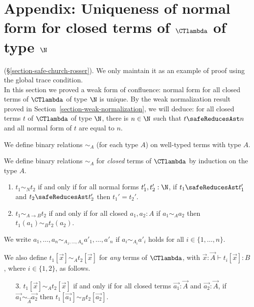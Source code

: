 
\section{Appendix: Uniqueness of normal form for closed terms of $\CTlambda$ of type $\N$}
\label{section-uniqueness-normal-form}
(\S \ref{section-safe-church-rosser}). 
We only maintain it as an example of proof using the global trace condition.
\\

In this section we proved a weak form of confluence: normal form for
all closed terms of $\CTlambda$ of type $\N$ is unique.
By the weak normalization result proved in Section~\ref{section-weak-normalization},
we will deduce: for all closed terms $t$ of $\CTlambda$ of type $\N$,
there is $n \in \N$ such that $t \safeReducesAst n$
and all normal form of $t$ are equal to $n$. 

We define binary relations $\sim_A$ (for each type $A$) on well-typed terms with type $A$.
\begin{definition}
  We define binary relations $\sim_A$ for \emph{closed} terms of $\CTlambda$
  by induction on the type $A$. 
  \begin{enumerate}
  \item
    $t_1 \sim_N t_2$ if and only if for all normal forms $t_1',t_2':\N$, if $t_1 \safeReducesAst t_1'$
    and $t_2 \safeReducesAst t_2'$ then $t_1' = t_2'$.
  \item
    $t_1 \sim_{A\rightarrow B} t_2$ if and only if for all closed $a_1,a_2:A$ if
    $a_1 \sim_A a_2$ then $t_1(a_1) \sim_B t_2(a_2)$.
  \end{enumerate}
  We write $a_1,\ldots,a_n \sim_{A_1,\ldots,A_n} a'_1,\ldots,a'_n$ if $a_i\sim_{A_i} a'_i$ holds
  for all $i\in\{1,\ldots,n\}$. 
  
  We also define $t_1[\vec{x}] \sim_A t_2[\vec{x}]$ for \emph{any} terms of $\CTlambda$,
  with $\vec{x}:\vec{A}\vdash t_i[\vec{x}]:B$, where $i\in\{1,2\}$, as follows. 
  \begin{enumerate}
  \item[3.]
    $t_1[\vec{x}] \sim_A t_2[\vec{x}]$ if and only if
    for all closed terms $\vec{a_1}:\vec{A}$ and $\vec{a_2}:\vec{A}$,
    if $\vec{a_1}\sim_{\vec{A}}\vec{a_2}$ then $t_1[\vec{a_1}] \sim_B t_2[\vec{a_2}]$. 
  \end{enumerate}  
  
\end{definition}

